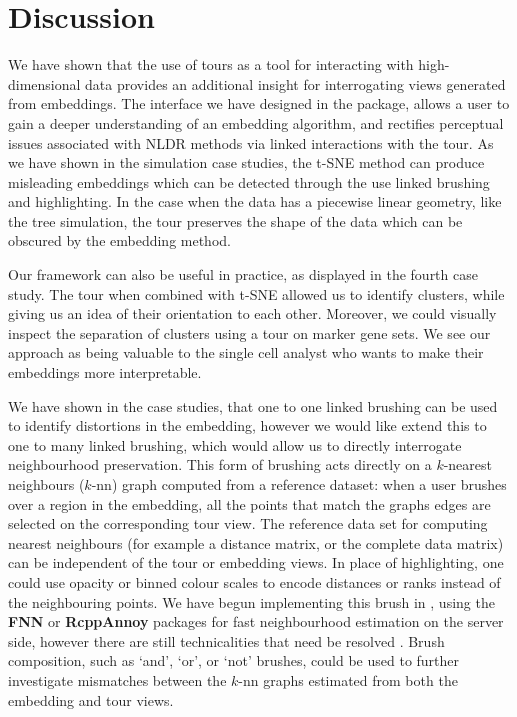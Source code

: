 \documentclass[article,notitle]{jdssv}
\begin{document}
\hypertarget{discussion}{%
\section{Discussion}\label{discussion}}

We have shown that the use of tours as a tool for interacting with
high-dimensional data provides an additional insight for interrogating views
generated from embeddings. The interface we have designed in the 
package, allows a user to gain a deeper understanding of an embedding
algorithm, and rectifies perceptual issues associated with NLDR methods via
linked interactions with the tour. As we have shown in the simulation case
studies, the t-SNE method can produce misleading embeddings which can be
detected through the use linked brushing and highlighting. In the case when
the data has a piecewise linear geometry, like the tree simulation, the tour
preserves the shape of the data which can be obscured by the embedding method.

Our framework can also be useful in practice, as displayed
in the fourth case study. The tour when combined with t-SNE allowed us
to identify clusters, while giving us an idea of their orientation to
each other. Moreover, we could visually inspect the separation of clusters
using a tour on marker gene sets. We see our approach as being valuable
to the single cell analyst who wants to make their embeddings more
interpretable.

We have shown in the case studies, that one to one linked brushing can
be used to identify distortions in the embedding, however we would
like extend this to one to many linked brushing, which would allow us to directly interrogate neighbourhood preservation. This form of brushing acts directly on a \(k\)-nearest neighbours (\(k\)-nn) graph computed from a
reference dataset: when a user brushes over a region in the embedding,
all the points that match the graphs edges are selected on the
corresponding tour view. The reference data set for computing
nearest neighbours (for example a distance matrix, or the complete data matrix)
can be independent of the tour or embedding views. In place of
highlighting, one could use opacity or binned colour scales to encode
distances or ranks instead of the neighbouring points. We have begun
implementing this brush in , using the \textbf{FNN} or \textbf{RcppAnnoy}
packages for fast neighbourhood estimation on the server side, however there
are still technicalities that need be resolved \citep{fnn-pkg, rcpp-annoy-pkg}.
Brush composition, such as `and', `or', or `not' brushes, could be used to
further investigate mismatches between the \(k\)-nn graphs estimated from both the embedding and tour views.
\end{document}

